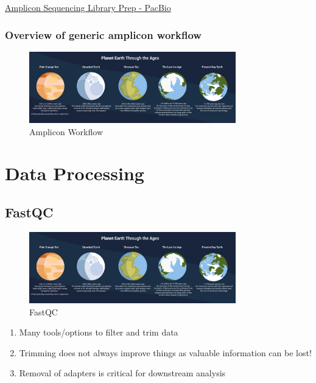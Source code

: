 \documentclass[
]{book}
\providecommand{\tightlist}{%
  \setlength{\itemsep}{0pt}\setlength{\parskip}{0pt}}
\begin{document}
\href{https://www.pacb.com/wp-content/uploads/Multiplexed-Amplicon-Library-Preparation-Using-SMRTbell-Express-Template-Prep-Kit-2.0-–-Customer-Training.pdf}{Amplicon Sequencing Library Prep - PacBio}

\hypertarget{overview-of-generic-amplicon-workflow}{%
\subsubsection{Overview of generic amplicon workflow}\label{overview-of-generic-amplicon-workflow}}

\begin{figure}
\centering
\includegraphics[width=0.8\textwidth,height=\textheight]{./Figures/Planets.png}
\caption{Amplicon Workflow}
\end{figure}

\hypertarget{data-processing}{%
\section*{Data Processing}\label{data-processing}}

\hypertarget{fastqc}{%
\subsection{FastQC}\label{fastqc}}

\begin{figure}
\centering
\includegraphics[width=0.8\textwidth,height=\textheight]{./Figures/Planets.png}
\caption{FastQC}
\end{figure}

\begin{enumerate}
\def\labelenumi{\arabic{enumi}.}
\tightlist
\item
  Many tools/options to filter and trim data
\item
  Trimming does not always improve things as valuable information
  can be lost!
\item
  Removal of adapters is critical for downstream analysis
\end{enumerate}
\end{document}
